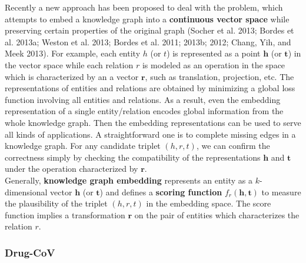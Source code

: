 \documentclass{article}
\begin{document}
\begin{itemize}
\begin{displayquote}
Recently a new approach has been proposed to deal with the problem, which attempts to embed a knowledge graph into a \textbf{continuous vector space} while preserving certain properties of the original graph (Socher et al. 2013; Bordes et al. 2013a; Weston et al. 2013; Bordes et al. 2011; 2013b; 2012; Chang, Yih, and Meek 2013). For example, each entity $ h $ (or $ t $) is represented as a point $ \mathbf{h} $ (or $ \mathbf{t} $) in the vector space while each relation $ r $ is modeled as an operation in the space which is characterized by an a vector $ \mathbf{r} $, such as translation, projection, etc. The representations of entities and relations are obtained by minimizing a global loss function involving all entities and relations. As a result, even the embedding representation of a single entity/relation encodes global information from the whole knowledge graph. Then the embedding representations can be used to serve all kinds of applications. A straightforward one is to complete missing edges in a knowledge graph. For any candidate triplet $ (h, r, t) $, we can confirm the correctness simply by checking the compatibility of the representations $ \mathbf{h} $ and $ \mathbf{t} $ under the operation characterized by $ \mathbf{r} $.\\
Generally, \textbf{knowledge graph embedding} represents an entity as a $ k $-dimensional vector $ \mathbf{h} $ (or $ \mathbf{t} $) and defines a \textbf{scoring function} $ f_r(\mathbf{h}, \mathbf{t}) $ to measure the plausibility of the triplet $ (h, r, t) $ in the embedding space. The score function implies a transformation $ \mathbf{r} $ on the pair of entities which characterizes the relation $ r $.
\end{displayquote}

\end{itemize}


\subsubsection{Drug-CoV}
\end{document}
